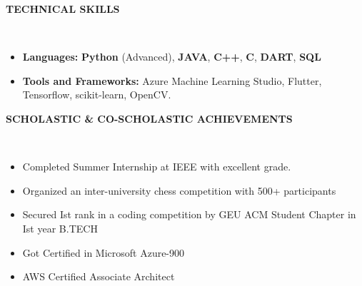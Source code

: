 \documentclass[a4paper,10pt]{article}
\newcommand{\lsep}{-0.5cm}
\newcommand{\resheading}[1]{{\small \colorbox{mygrey}{\begin{minipage}{0.98\textwidth}{\textbf{#1 \vphantom{p\^{E}}}}\end{minipage}}}}
\begin{document}
\resheading{\textbf{TECHNICAL SKILLS} }\\[\lsep]
\begin{itemize}[itemsep=0.1mm, parsep=0pt]
\item \noindent \textbf{Languages:} \textbf{Python} (Advanced), \textbf{JAVA}, \textbf{C++}, \textbf{C}, \textbf{DART},  \textbf{SQL} \\
\item \noindent\textbf{Tools and Frameworks:} Azure Machine Learning Studio, Flutter, Tensorflow, scikit-learn, OpenCV.\\
\end{itemize}

\resheading{\textbf{SCHOLASTIC \& CO-SCHOLASTIC ACHIEVEMENTS} }\\[\lsep]
\begin{itemize}[itemsep=0.01mm, parsep=2pt]
\item \noindent Completed Summer Internship at IEEE with excellent grade.
\item \noindent Organized an inter-university chess competition with 500+ participants
\item \noindent Secured Ist rank in a coding competition by GEU ACM Student Chapter in Ist year B.TECH
\item \noindent Got Certified in Microsoft Azure-900
\item \noindent AWS Certified Associate Architect
\end{itemize}
\end{document}
